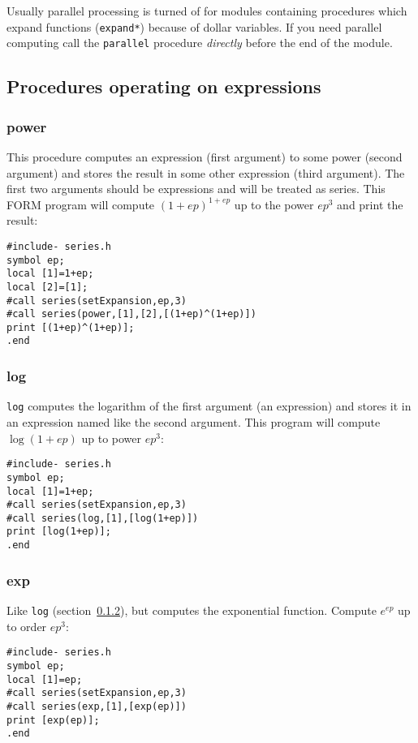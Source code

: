 \documentclass[titlepage]{article}
\begin{document}
Usually parallel processing is turned of for modules containing
procedures which expand functions ({\tt expand*}) because of
dollar variables. If you need
parallel computing call the {\tt parallel} procedure {\em directly}
  before the end of the module.

\subsection{Procedures operating on expressions}
\label{sec:proc_expr}

\subsubsection{power}
\label{sec:pow}

This procedure computes an expression (first argument) to some power
(second argument) and stores the result in some other expression (third
argument). The first two arguments should be expressions and will be
treated as series. This FORM program will compute $(1+ep)^{1+ep}$ up to
the power $ep^3$ and print the result:
\begin{lstlisting}
#include- series.h
symbol ep;
local [1]=1+ep;
local [2]=[1];
#call series(setExpansion,ep,3)
#call series(power,[1],[2],[(1+ep)^(1+ep)])
print [(1+ep)^(1+ep)];
.end
\end{lstlisting}


\subsubsection{log}
\label{sec:log}

{\tt log} computes the logarithm of the first argument (an
expression) and stores it in an expression named like the second
argument. This program will compute $\log (1+ep)$ up to power $ep^3$:
\begin{lstlisting}
#include- series.h
symbol ep;
local [1]=1+ep;
#call series(setExpansion,ep,3)
#call series(log,[1],[log(1+ep)])
print [log(1+ep)];
.end
\end{lstlisting}



\subsubsection{exp}
\label{sec:exp}

Like {\tt log} (section~\ref{sec:log}), but computes the
exponential function. Compute $e^{ep}$ up to order $ep^3$:
\begin{lstlisting}
#include- series.h
symbol ep;
local [1]=ep;
#call series(setExpansion,ep,3)
#call series(exp,[1],[exp(ep)])
print [exp(ep)];
.end
\end{lstlisting}
\end{document}
